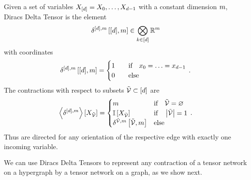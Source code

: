 \begin{example}
    Given a set of variables $X_{[d]}=X_{0},\ldots,X_{d-1}$ with a constant dimension $m$, Diracs Delta Tensor is the element
    \begin{align*}
        \delta^{[d],m}\left[[d],m\right] \in \bigotimes_{k\in[d]} \mathbb{R}^{m}
    \end{align*}
    with coordinates
    \begin{align}
        \delta^{[d],m}\left[[d],m\right] =
        \begin{cases}
            1 \quad & \text{if} \quad x_{0} = \ldots = x_{d-1} \\
            0 & \text{else}
        \end{cases} \, .
    \end{align}
    The contractions with respect to subsets $\tilde{\mathcal{V}}\subset[d]$ are
    \begin{align}
        \left\langle \delta^{[d],m}\right\rangle \left[ X_{\tilde{\mathcal{V}}} \right] =
        \begin{cases}
            m & \text{if} \quad \tilde{\mathcal{V}} = \varnothing \\
            \mathbb{I}\left[X_{\tilde{\mathcal{V}}}\right] & \text{if} \quad \left|\tilde{\mathcal{V}}\right| = 1\\
            \delta^{\tilde{\mathcal{V}},m}\left[\tilde{\mathcal{V}},m\right] & \text{else}
        \end{cases} \, .
    \end{align}
    Thus are directed for any orientation of the respective edge with exactly one incoming variable.
\end{example}

We can use Diracs Delta Tensors to represent any contraction of a tensor network on a hypergraph by a tensor network on a graph, as we show next.

